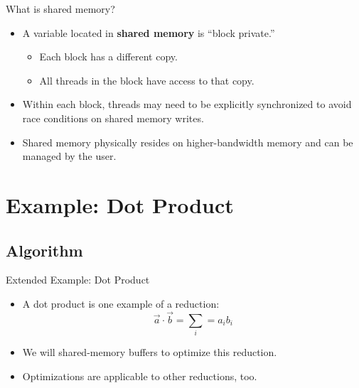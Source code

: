 \documentclass{beamer}
\begin{document}
    \begin{frame}{What is shared memory?}
        \begin{itemize}
            \item A variable located in \textbf{shared memory} is ``block private.''
            \begin{itemize}
                \item Each block has a different copy.
                \item All threads in the block have access to that copy.
            \end{itemize}
            \item Within each block, threads may need to be explicitly synchronized to avoid race conditions on shared memory writes.
            \item Shared memory physically resides on higher-bandwidth memory and can be managed by the user.
        \end{itemize}
    \end{frame}
    
    \section{Example: Dot Product}
    
    \subsection{Algorithm}

    \begin{frame}{Extended Example: Dot Product}
        \begin{itemize}
            \item A dot product is one example of a reduction:
            \begin{equation*}
                \vec{a} \cdot \vec{b} = \sum_i = a_i b_i
            \end{equation*}
            \item We will shared-memory buffers to optimize this reduction.
            \item Optimizations are applicable to other reductions, too.
        \end{itemize}
    \end{frame}
\end{document}
